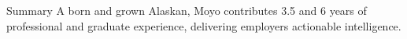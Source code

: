 \documentclass{resume} %
\begin{document}
\begin{rSection}{Summary}
    A born and grown Alaskan, Moyo contributes 3.5 and 6 years of professional and graduate experience, delivering employers actionable intelligence.
\end{rSection}

\begin{comment}
    \begin{rSection}{Summary}

    A born AND grown Alaskan, Moyo is a passionate data scientist who integrates analytical and computational methods to share meaningful insight. Employers will be hiring a data scientist who:
    {\begin{itemize}
        \item {uses 6+ years of experience collecting, cleansing, analyzing, and reporting to provide actionable data-driven insights to a variety of stakeholders}
        \item {can adeptly apply inferential statistics and machine learning using scikit-learn, MLOps, and other relevant packages to produce high-caliber work}
        \item {understands how to connect novel data science techniques to specific business questions}
    \end{itemize} }

    \end{rSection}
\end{comment}

\end{document}

